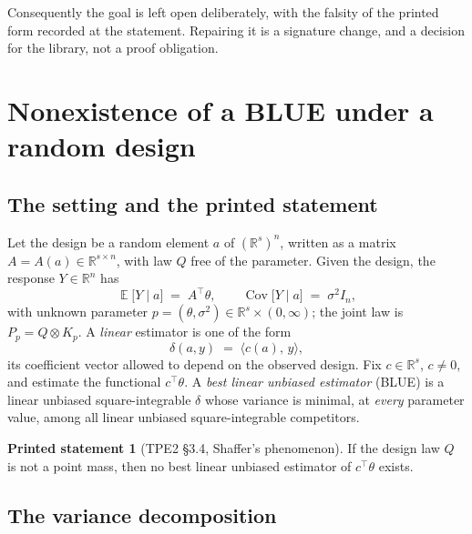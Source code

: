 \documentclass[11pt]{article}
\theoremstyle{plain}
\theoremstyle{definition}
\newtheorem{claim}[theorem]{Printed statement}
\theoremstyle{remark}
\DeclareMathOperator{\Cov}{Cov}
\DeclareMathOperator{\E}{\mathbb{E}}
\newcommand{\R}{\mathbb{R}}
\begin{document}
Consequently the goal is left open deliberately, with the falsity of the printed form
recorded at the statement. Repairing it is a signature change, and a decision for the
library, not a proof obligation.

\section{Nonexistence of a BLUE under a random design}

\subsection{The setting and the printed statement}

Let the design be a random element $a$ of $(\R^{s})^{n}$, written as a matrix
$A=A(a)\in\R^{s\times n}$, with law $Q$ free of the parameter. Given the design, the
response $Y\in\R^{n}$ has
\[
  \E\bigl[Y \mid a\bigr] \;=\; A^{\!\top}\theta,
  \qquad
  \Cov\bigl[Y \mid a\bigr] \;=\; \sigma^{2} I_n ,
\]
with unknown parameter $p=(\theta,\sigma^{2})\in\R^{s}\times(0,\infty)$; the joint law is
$P_p = Q\otimes K_p$. A \emph{linear} estimator is one of the form
\[
  \delta(a,y) \;=\; \langle c(a),\,y\rangle ,
\]
its coefficient vector allowed to depend on the observed design. Fix $c\in\R^{s}$,
$c\ne 0$, and estimate the functional $c^{\!\top}\theta$. A \emph{best linear unbiased
estimator} (BLUE) is a linear unbiased square-integrable $\delta$ whose variance is minimal,
at \emph{every} parameter value, among all linear unbiased square-integrable competitors.

\begin{claim}[TPE2 \S3.4, Shaffer's phenomenon]\label{claim:blue}
If the design law $Q$ is not a point mass, then no best linear unbiased estimator of
$c^{\!\top}\theta$ exists.
\end{claim}

\subsection{The variance decomposition}
\end{document}
